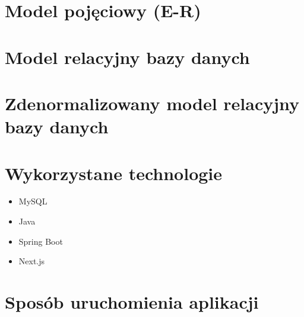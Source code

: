 \documentclass[11pt,a4paper]{article}
\begin{document}
\section{Model pojęciowy (E-R)}

\section{Model relacyjny bazy danych}

\section{Zdenormalizowany model relacyjny bazy danych}

\section{Wykorzystane technologie}

\begin{itemize}
    \item MySQL
    \item Java
    \item Spring Boot
    \item Next.js
\end{itemize}

\section{Sposób uruchomienia aplikacji}
\end{document}
